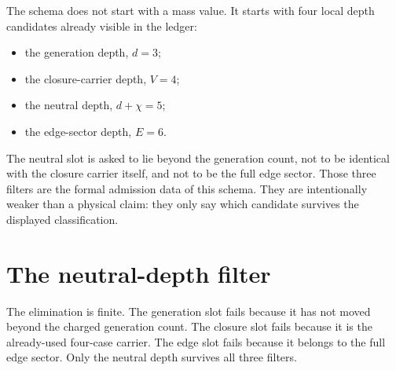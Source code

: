 \documentclass[11pt]{article}
\begin{document}
The schema does not start with a mass value.  It starts with four local
depth candidates already visible in the ledger:

\begin{itemize}
\item the generation depth, $d = 3$;
\item the closure-carrier depth, $V = 4$;
\item the neutral depth, $d + \chi = 5$;
\item the edge-sector depth, $E = 6$.
\end{itemize}

The neutral slot is asked to lie beyond the generation count, not to be
identical with the closure carrier itself, and not to be the full edge
sector.  Those three filters are the formal admission data of this
schema.  They are intentionally weaker than a physical claim:
they only say which candidate survives the displayed classification.


\section{The neutral-depth filter}

The elimination is finite.  The generation slot fails because it has
not moved beyond the charged generation count.  The closure slot fails
because it is the already-used four-case carrier.  The edge slot fails
because it belongs to the full edge sector.  Only the neutral depth
survives all three filters.
\end{document}
